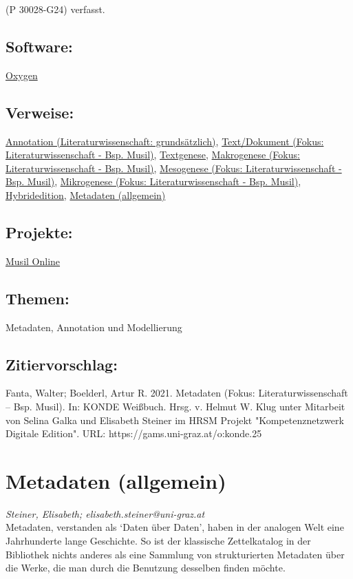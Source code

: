 \documentclass{article}
\begin{document}
                  (P 30028-G24) verfasst.\subsection*{Software:}\href{http://oxygenxml.com/}{Oxygen}\subsection*{Verweise:}\href{https://gams.uni-graz.at/o:konde.17}{Annotation (Literaturwissenschaft:
                           grundsätzlich)}, \href{https://gams.uni-graz.at/o:konde.27}{Text/Dokument (Fokus:
                           Literaturwissenschaft - Bsp. Musil)}, \href{https://gams.uni-graz.at/o:konde.28}{Textgenese}, \href{https://gams.uni-graz.at/o:konde.23}{Makrogenese (Fokus:
                           Literaturwissenschaft - Bsp. Musil)}, \href{https://gams.uni-graz.at/o:konde.24}{Mesogenese (Fokus:
                           Literaturwissenschaft - Bsp. Musil)}, \href{https://gams.uni-graz.at/o:konde.26}{Mikrogenese (Fokus:
                           Literaturwissenschaft - Bsp. Musil)}, \href{https://gams.uni-graz.at/o:konde.96}{Hybridedition}, \href{https://gams.uni-graz.at/o:konde.225}{Metadaten (allgemein)}\subsection*{Projekte:}\href{http://musilonline.at}{Musil Online}\subsection*{Themen:}Metadaten, Annotation und Modellierung\subsection*{Zitiervorschlag:}Fanta, Walter; Boelderl, Artur R. 2021. Metadaten (Fokus: Literaturwissenschaft – Bsp. Musil). In: KONDE Weißbuch. Hrsg. v. Helmut W. Klug unter Mitarbeit von Selina Galka und Elisabeth Steiner im HRSM Projekt "Kompetenznetzwerk Digitale Edition". URL: https://gams.uni-graz.at/o:konde.25\newpage\section*{Metadaten (allgemein)} \emph{Steiner, Elisabeth; elisabeth.steiner@uni-graz.at }\\
        
    Metadaten, verstanden als ‘Daten über Daten’, haben in der analogen Welt eine Jahrhunderte lange Geschichte. So ist der klassische Zettelkatalog in der Bibliothek nichts anderes als eine Sammlung von strukturierten Metadaten über die Werke, die man durch die Benutzung desselben finden möchte.\\
            
\end{document}
